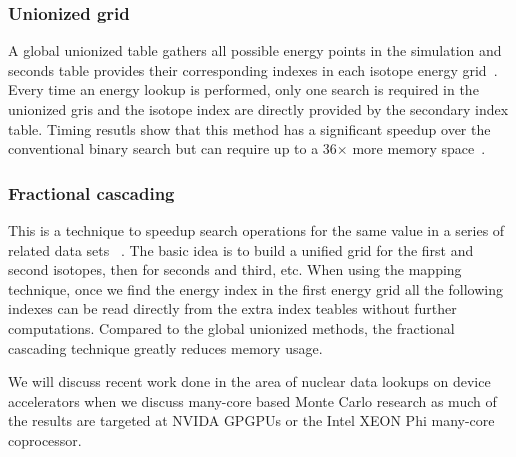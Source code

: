 \subsubsection*{ \textbf{Unionized grid} } A global unionized table gathers all possible energy points in the simulation and seconds table provides their corresponding indexes in each isotope energy grid~\cite{leppanen2009two}. Every time an energy lookup is performed, only one search is required in the unionized gris and the isotope index are directly provided by the secondary index table. Timing resutls show that this method has a significant speedup over the conventional binary search but can require up to a 36$\times$ more memory space~\cite{a.l.lunda.r.siegel2015}.
%
\subsubsection*{ \textbf{Fractional cascading} } This is a technique to speedup search operations for the same value in a series of related data sets ~\cite{a.l.lunda.r.siegel2015}. The basic idea is to build a unified grid for the first and second isotopes, then for seconds and third, etc. When using the mapping technique, once we find the energy index in the first energy grid all the following indexes can be read directly from the extra index teables without further computations. Compared to the global unionized methods, the fractional cascading technique greatly reduces memory usage.

%
We will discuss recent work done in the area of nuclear data lookups on device accelerators when we discuss many-core based Monte Carlo research as much of the results are targeted at NVIDA GPGPUs or the Intel XEON Phi many-core coprocessor. 
